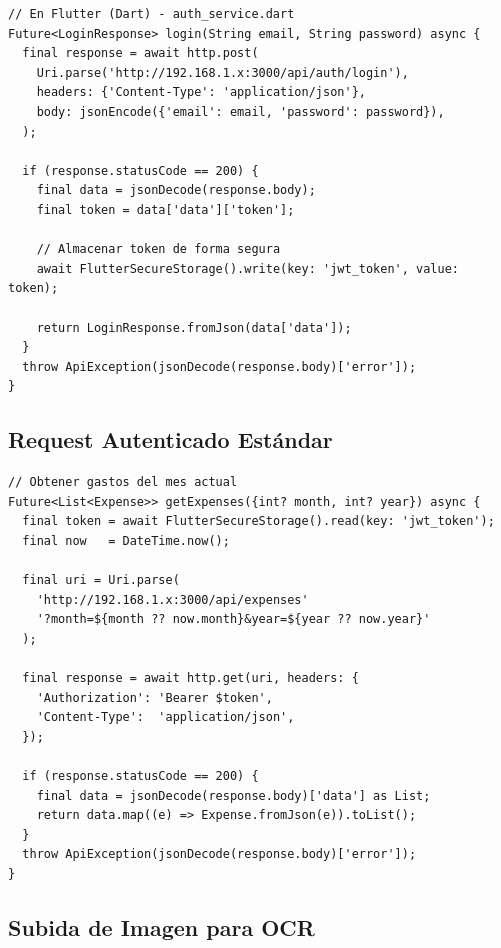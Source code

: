 \begin{lstlisting}[style=bash, caption={Login y almacenamiento del JWT en Flutter (Dart)}]
// En Flutter (Dart) - auth_service.dart
Future<LoginResponse> login(String email, String password) async {
  final response = await http.post(
    Uri.parse('http://192.168.1.x:3000/api/auth/login'),
    headers: {'Content-Type': 'application/json'},
    body: jsonEncode({'email': email, 'password': password}),
  );

  if (response.statusCode == 200) {
    final data = jsonDecode(response.body);
    final token = data['data']['token'];

    // Almacenar token de forma segura
    await FlutterSecureStorage().write(key: 'jwt_token', value: token);

    return LoginResponse.fromJson(data['data']);
  }
  throw ApiException(jsonDecode(response.body)['error']);
}
\end{lstlisting}

\subsection{Request Autenticado Estándar}

\begin{lstlisting}[style=bash, caption={Patrón de request autenticado en Flutter}]
// Obtener gastos del mes actual
Future<List<Expense>> getExpenses({int? month, int? year}) async {
  final token = await FlutterSecureStorage().read(key: 'jwt_token');
  final now   = DateTime.now();

  final uri = Uri.parse(
    'http://192.168.1.x:3000/api/expenses'
    '?month=${month ?? now.month}&year=${year ?? now.year}'
  );

  final response = await http.get(uri, headers: {
    'Authorization': 'Bearer $token',
    'Content-Type':  'application/json',
  });

  if (response.statusCode == 200) {
    final data = jsonDecode(response.body)['data'] as List;
    return data.map((e) => Expense.fromJson(e)).toList();
  }
  throw ApiException(jsonDecode(response.body)['error']);
}
\end{lstlisting}

\subsection{Subida de Imagen para OCR}

